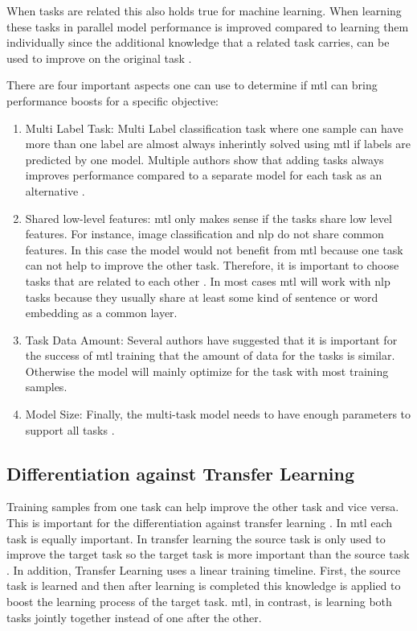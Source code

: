 When tasks are related this also holds true for machine learning. When learning these tasks in parallel model performance is improved compared to learning them individually since the additional knowledge that a related task carries, can be used to improve on the original task \cite{Caruana1997a}. 

There are four important aspects one can use to determine if \gls{mtl} can bring performance boosts for a specific objective:
\begin{enumerate}
	\item Multi Label Task: Multi Label classification task where one sample can have more than one label are almost always inherintly solved using \gls{mtl} if labels are predicted by one model. Multiple authors show that adding tasks always improves performance compared to a separate model for each task as an alternative \cite{Ramsundar2015}. %
	\item Shared low-level features: \gls{mtl} only makes sense if the tasks share low level features. For instance, image classification and \gls{nlp} do not share common features. In this case the model would not benefit from \gls{mtl} because one task can not help to improve the other task. Therefore, it is important to choose tasks that are related to each other \cite{Zhang2017a}. In most cases \gls{mtl} will work with \gls{nlp} tasks because they usually share at least some kind of sentence or word embedding as a common layer.   %
	\item Task Data Amount: Several authors have suggested that it is important for the success of \gls{mtl} training that the amount of data for the tasks is similar. Otherwise the model will mainly optimize for the task with most training samples.
	\item Model Size: Finally, the multi-task model needs to have enough parameters to support all tasks \cite{Caruana1997a}. 
	\end{enumerate}


\subsection{Differentiation against Transfer Learning}

Training samples from one task can help improve the other task and vice versa. This is important for the differentiation against transfer learning \cite{Pratt1993}. In \gls{mtl} each task is equally important. In transfer learning the source task is only used to improve the target task so the target task is more important than the source task \cite{Zhang2017a}. In addition, Transfer Learning uses a linear training timeline. First, the source task is learned and then after learning is completed this knowledge is applied to boost the learning process of the target task. \gls{mtl}, in contrast, is learning both tasks jointly together instead of one after the other.


